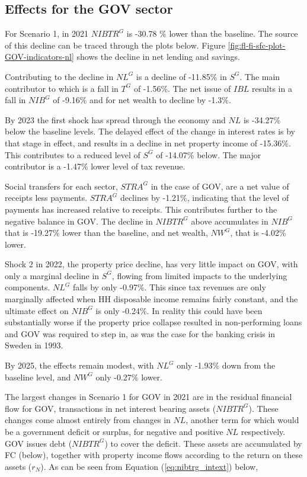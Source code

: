 \documentclass[
]{book}
\begin{document}
\hypertarget{effects-for-the-gov-sector}{%
\subsection{Effects for the GOV sector}\label{effects-for-the-gov-sector}}

For Scenario 1, in 2021 \(NIBTR^G\) is -30.78 \% lower than the baseline. The source of this decline can be traced through the plots below. Figure \ref{fig:fl-fi-sfc-plot-GOV-indicators-nl} shows the decline in net lending and savings.

Contributing to the decline in \(NL^G\) is a decline of -11.85\% in \(S^G\). The main contributor to which is a fall in \(T^G\) of -1.56\%. The net issue of \(IBL\) results in a fall in \(NIB^G\) of -9.16\% and for net wealth to decline by -1.3\%.

By 2023 the first shock has spread through the economy and \(NL\) is -34.27\% below the baseline levels. The delayed effect of the change in interest rates is by that stage in effect, and results in a decline in net property income of -15.36\%. This contributes to a reduced level of \(S^G\) of -14.07\% below. The major contributor is a -1.47\% lower level of tax revenue.

Social transfers for each sector, \(STRA^G\) in the case of GOV, are a net value of receipts less payments. \(STRA^G\) declines by -1.21\%, indicating that the level of payments has increased relative to receipts. This contributes further to the negative balance in GOV. The decline in \(NIBTR^G\) above accumulates in \(NIB^G\) that is -19.27\% lower than the baseline, and net wealth, \(NW^G\), that is -4.02\% lower.

Shock 2 in 2022, the property price decline, has very little impact on GOV, with only a marginal decline in \(S^G\), flowing from limited impacts to the underlying components. \(NL^G\) falls by only -0.97\%. This since tax revenues are only marginally affected when HH disposable income remains fairly constant, and the ultimate effect on \(NIB^G\) is only -0.24\%. In reality this could have been substantially worse if the property price collapse resulted in non-performing loans and GOV was required to step in, as was the case for the banking crisis in Sweden in 1993. \citep{englund1999}

By 2025, the effects remain modest, with \(NL^G\) only -1.93\% down from the baseline level, and \(NW^G\) only -0.27\% lower.

The largest changes in Scenario 1 for GOV in 2021 are in the residual financial flow for GOV, transactions in net interest bearing assets (\(NIBTR^G\)). These changes come almost entirely from changes in \(NL\), another term for which would be a government deficit or surplus, for negative and positive \(NL\) respectively. GOV issues debt (\(NIBTR^G\)) to cover the deficit. These assets are accumulated by FC (below), together with property income flows according to the return on these assets (\(r_N\)). As can be seen from Equation (\ref{eq:nibtrg_intext}) below,
\end{document}
